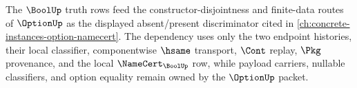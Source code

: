 The $\BoolUp$ truth rows feed the constructor-disjointness and finite-data routes of $\OptionUp$ as the displayed absent/present discriminator cited in \autoref{ch:concrete-instances-option-namecert}. The dependency uses only the two endpoint histories, their local classifier, componentwise $\hsame$ transport, $\Cont$ replay, $\Pkg$ provenance, and the local $\NameCert_{\BoolUp}$ row, while payload carriers, nullable classifiers, and option equality remain owned by the $\OptionUp$ packet.
